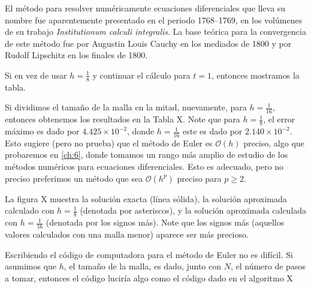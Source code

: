 {El método para resolver numéricamente ecuaciones diferenciales que lleva su nombre fue aparentemente presentado en el periodo 1768--1769, en los volúmenes de su trabajo \emph{Institutionum calculi integralis}. La base teórica para la convergencia de este método fue %
por Augustin Louis Cauchy en los mediados de 1800 y por Rudolf Lipschitz en los finales de 1800.
}

Si en vez de usar $h=\frac{1}{8}$ y continuar el cálculo para $t=1$, entonces mostramos la tabla.

Si dividimos el tamaño de la malla en la mitad, nuevamente, para $h=\frac{1}{16}$, entonces obtenemos los resultados en la Tabla X. Note que para $h=\frac{1}{8}$, el error máximo es dado por $4.425\times 10^{-2}$, donde $h=\frac{1}{16}$ este es dado por $2.140\times10^{-2}$. Esto sugiere (pero no prueba) que el método de Euler es $\mathcal{O}\left(h\right)$ preciso, algo que probaremos en \autoref{ch:6}, donde tomamos un rango más amplio de estudio de los métodos numéricos para ecuaciones diferenciales. Esto es adecuado, pero no preciso %
preferimos un método que sea $\mathcal{O}\left(h^{p}\right)$ preciso para $p\geq2.$

La figura X muestra la solución exacta (línea sólida), la solución aproximada calculado con $h=\frac{1}{8}$ (denotada por asteriscos), y la solución aproximada calculada con $h=\frac{1}{16}$ (denotada por los signos más). Note que los signos más (aquellos valores calculados con una malla menor) aparece ser más precioso.

Escribiendo el código de computadora para el método de Euler no es difícil. Si asumimos que $h$, el tamaño de la malla, es dado, junto con $N$, el número de pasos a tomar, entonces el código luciría algo como el código dado en el algoritmo X

\newpage

